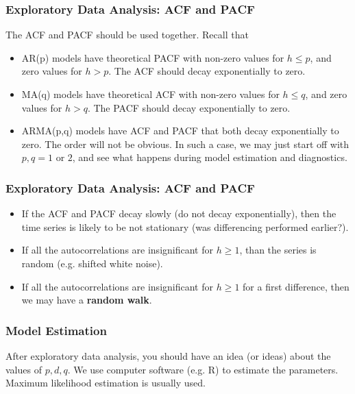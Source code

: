 \documentclass[%
xcolor=pdftex]{beamer}
\begin{document}
\begin{frame}
\frametitle{Exploratory Data Analysis: ACF and PACF}

The ACF and PACF should be used together. Recall that

\begin{itemize}
\item AR(p) models have theoretical PACF with non-zero values for $h \leq p$, and zero values for $h>p$. The ACF should decay exponentially to zero.
\item MA(q) models have theoretical ACF with non-zero values for $h \leq q$, and zero values for $h>q$. The PACF should decay exponentially to zero.
\item ARMA(p,q) models have ACF and PACF that both decay exponentially to zero. The order will not be obvious. In such a case, we may just start off with $p,q = 1 \text{ or } 2$, and see what happens during model estimation and diagnostics.
\end{itemize}


\end{frame}

\begin{frame}
\frametitle{Exploratory Data Analysis: ACF and PACF}

\begin{itemize}
\item If the ACF and PACF decay slowly (do not decay exponentially), then the time series is likely to be not stationary (was differencing performed earlier?).
\item If all the autocorrelations are insignificant for $h \geq 1$, than the series is random (e.g. shifted white noise).
\item If all the autocorrelations are insignificant for $h \geq 1$ for a first difference, then we may have a \textbf{random walk}.
\end{itemize}


\end{frame}


\begin{frame}
\frametitle{Model Estimation}

After exploratory data analysis, you should have an idea (or ideas) about the values of $p,d,q$. We use computer software (e.g. R) to estimate the parameters. Maximum likelihood estimation is usually used.

\end{frame}
\end{document}
